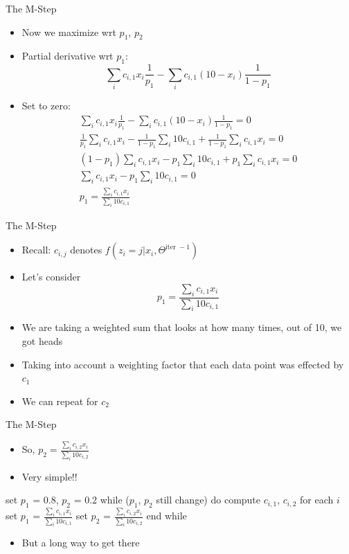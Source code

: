 \documentclass[aspectratio=169]{beamer}
\begin{document}
\begin{frame}{The M-Step}

{\small
	\begin{itemize}
	\item Now we maximize wrt $p_1$, $p_2$
	\item Partial derivative wrt $p_1$:
		$$\sum_i c_{i, 1} x_i \frac{1}{p_1} - \sum_i c_{i, 1} (10 - x_i) \frac{1}{1 - p_1}$$
	\item Set to zero:
	\begin{align}
		\sum_i c_{i, 1} x_i \frac{1}{p_1} - \sum_i c_{i, 1} (10 - x_i) \frac{1}{1 - p_1} = 0 \nonumber \\
		\frac{1}{p_1} \sum_i c_{i, 1} x_i - \frac{1}{1 - p_1} \sum_i 10 c_{i, 1} + \frac{1}{1 - p_1} \sum_i c_{i, 1} x_i = 0 \nonumber \\
		(1 - p_1) \sum_i c_{i, 1} x_i - p_1 \sum_i 10 c_{i, 1} + p_1 \sum_i c_{i, 1} x_i = 0 \nonumber \\
		\sum_i c_{i, 1} x_i - p_1 \sum_i 10 c_{i, 1} = 0 \nonumber \\
		p_1 = \frac{\sum_i c_{i, 1} x_i}{\sum_i 10 c_{i, 1}} \nonumber
	\end{align}
	\end{itemize}
	}
  	\end{frame}
\begin{frame}{The M-Step}

	\begin{itemize}
	\item Recall: $c_{i, j}$ denotes $f (z_i = j | x_i, \Theta^{\textrm{iter }-1})$
	\item Let's consider
		$$p_1 = \frac{\sum_i c_{i, 1} x_i}{\sum_i 10 c_{i, 1}} $$
	\item We are taking a weighted sum that looks at how many times, out of 10, we got heads
	\item Taking into account a weighting factor  that each data point was effected by $c_1$ %
	\item We can repeat for $c_2$
	\end{itemize}
  	\end{frame}
\begin{frame}[fragile]{The M-Step}
        \begin{itemize}
	\item So, $p_2 = \frac{\sum_i c_{i, 2} x_i}{\sum_i 10 c_{i, 2}}$
	\item Very simple!!
	\end{itemize}
\begin{SQL}
set $p_1$ = 0.8, $p_2$ = 0.2
while ($p_1$, $p_2$ still change) do
  compute $c_{i, 1}$, $c_{i, 2}$ for each $i$
  set $p_1$ = $\frac{\sum_i c_{i, 1} x_i}{\sum_i 10 c_{i, 1}}$
  set $p_2$ = $\frac{\sum_i c_{i, 2} x_i}{\sum_i 10 c_{i, 2}}$
end while 
\end{SQL}
        \begin{itemize}
	\item But a long way to get there 
	\end{itemize}
\end{frame}
\end{document}
